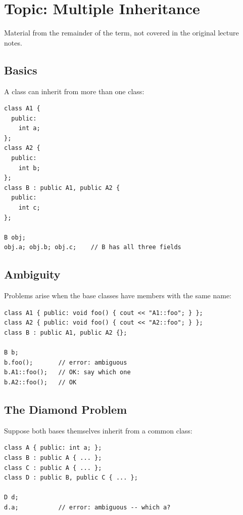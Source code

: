 \chapter{Topic: Multiple Inheritance}

\begin{aside}
Material from the remainder of the term, not covered in the original lecture
notes.
\end{aside}

\section{Basics}
A class can inherit from more than one class:
\begin{lstlisting}[style=cpp]
class A1 {
  public:
    int a;
};
class A2 {
  public:
    int b;
};
class B : public A1, public A2 {
  public:
    int c;
};

B obj;
obj.a; obj.b; obj.c;    // B has all three fields
\end{lstlisting}

\begin{center}
\end{center}

\section{Ambiguity}
Problems arise when the base classes have members with the same name:
\begin{lstlisting}[style=cpp]
class A1 { public: void foo() { cout << "A1::foo"; } };
class A2 { public: void foo() { cout << "A2::foo"; } };
class B : public A1, public A2 {};

B b;
b.foo();       // error: ambiguous
b.A1::foo();   // OK: say which one
b.A2::foo();   // OK
\end{lstlisting}

\section{The Diamond Problem}
Suppose both bases themselves inherit from a common class:
\begin{lstlisting}[style=cpp]
class A { public: int a; };
class B : public A { ... };
class C : public A { ... };
class D : public B, public C { ... };

D d;
d.a;           // error: ambiguous -- which a?
\end{lstlisting}

